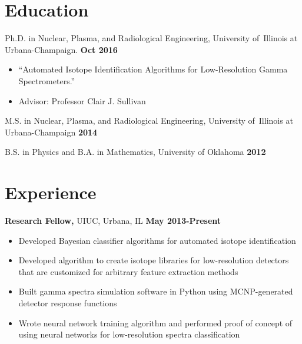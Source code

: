 \documentclass[margin]{res}
\begin{document}
 
\begin{resume} 
 

\section{Education} 
Ph.D. in Nuclear, Plasma, and Radiological Engineering, University of\ Illinois at Urbana-Champaign.   \hspace{3.9in} \textbf{Oct 2016}

\begin{itemize}
\item ``Automated Isotope Identification Algorithms for Low-Resolution Gamma Spectrometers.''
\item Advisor: Professor Clair J. Sullivan
\end{itemize}

\vspace{-.05in}

M.S. in Nuclear, Plasma, and Radiological Engineering, University of\ Illinois at Urbana-Champaign  \hfill \textbf{2014}

\vspace{-.05in}

B.S. in Physics and B.A. in Mathematics, University of Oklahoma \hfill  \textbf{2012}
 

\section{Experience}

 {\bf Research Fellow,} UIUC, Urbana, IL \hfill \textbf{May 2013-Present}
 \begin{itemize} \itemsep -3pt  %
 \item Developed Bayesian classifier algorithms for automated isotope identification
\item Developed algorithm to create isotope libraries for low-resolution detectors that are customized for arbitrary feature extraction methods
 \item Built gamma spectra simulation software in Python using MCNP-generated detector response functions
 \item Wrote neural network training algorithm and performed proof of concept of using neural networks for low-resolution spectra classification
 \end{itemize} 
 

\end{resume}
\end{document}
